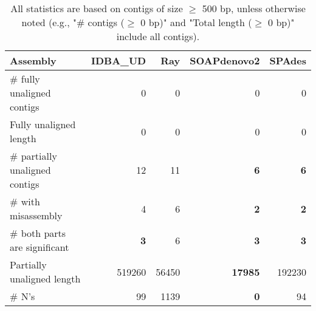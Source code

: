 \documentclass[12pt,a4paper]{article}
\begin{document}
\begin{table}[ht]
\begin{center}
\caption{All statistics are based on contigs of size $\geq$ 500 bp, unless otherwise noted (e.g., "\# contigs ($\geq$ 0 bp)" and "Total length ($\geq$ 0 bp)" include all contigs).}
\begin{tabular}{|l*{4}{|r}|}
\hline
Assembly & IDBA\_UD & Ray & SOAPdenovo2 & SPAdes \\ \hline
\# fully unaligned contigs & 0 & 0 & 0 & 0 \\ \hline
Fully unaligned length & 0 & 0 & 0 & 0 \\ \hline
\# partially unaligned contigs & 12 & 11 & {\bf 6} & {\bf 6} \\ \hline
\hspace{5mm}\# with misassembly & 4 & 6 & {\bf 2} & {\bf 2} \\ \hline
\hspace{5mm}\# both parts are significant & {\bf 3} & 6 & {\bf 3} & {\bf 3} \\ \hline
Partially unaligned length & 519260 & 56450 & {\bf 17985} & 192230 \\ \hline
\# N's & 99 & 1139 & {\bf 0} & 94 \\ \hline
\end{tabular}
\end{center}
\end{table}
\end{document}
